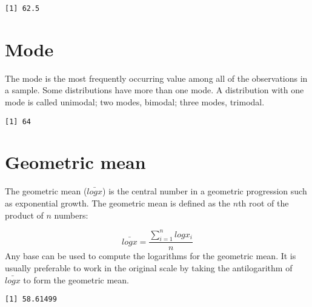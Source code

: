 \documentclass[]{book}
\newenvironment{Shaded}{\begin{snugshade}}{\end{snugshade}}
\newcommand{\KeywordTok}[1]{\textcolor[rgb]{0.13,0.29,0.53}{\textbf{#1}}}
\newcommand{\CommentTok}[1]{\textcolor[rgb]{0.56,0.35,0.01}{\textit{#1}}}
\newcommand{\OperatorTok}[1]{\textcolor[rgb]{0.81,0.36,0.00}{\textbf{#1}}}
\newcommand{\NormalTok}[1]{#1}
\theoremstyle{definition}
\theoremstyle{definition}
\theoremstyle{definition}
\theoremstyle{remark}
\begin{document}
\begin{Shaded}
\end{Shaded}

\begin{verbatim}
[1] 62.5
\end{verbatim}

\section{Mode}\label{mode}

The mode is the most frequently occurring value among all of the
observations in a sample. Some distributions have more than one mode. A
distribution with one mode is called unimodal; two modes, bimodal; three
modes, trimodal.

\begin{Shaded}
\end{Shaded}

\begin{verbatim}
[1] 64
\end{verbatim}

\section{Geometric mean}\label{geometric-mean}

The geometric mean (\(\bar{logx}\)) is the central number in a geometric
progression such as exponential growth. The geometric mean is defined as
the \({n}\)th root of the product of \({n}\) numbers:

\[\bar{logx}=\frac{\sum_{i=1}^nlogx_{i}}{n}\] Any base can be used to
compute the logarithms for the geometric mean. It is usually preferable
to work in the original scale by taking the antilogarithm of
\(\bar{logx}\) to form the geometric mean.

\begin{Shaded}
\end{Shaded}

\begin{verbatim}
[1] 58.61499
\end{verbatim}


\end{document}
